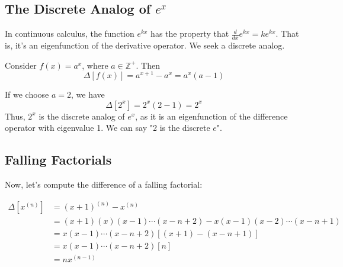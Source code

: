 \documentclass{report}
\begin{document}
\subsection{The Discrete Analog of $e^x$}

In continuous calculus, the function $e^{kx}$ has the property that $\frac{d}{dx}e^{kx} = ke^{kx}$.  That is, it's an eigenfunction of the derivative operator. We seek a discrete analog.

Consider $f(x) = a^x$, where $a \in \mathbb{Z}^+$. Then
\[
	\Delta[f(x)] = a^{x+1} - a^x = a^x(a - 1)
\]

If we choose $a=2$, we have
\[
	\Delta[2^x] = 2^x(2-1) = 2^x
\]
Thus, $2^x$ is the discrete analog of $e^x$, as it is an eigenfunction of the difference operator with eigenvalue 1. We can say "2 is the discrete $e$".

\subsection{Falling Factorials}




Now, let's compute the difference of a falling factorial:

\begin{align*}
	\Delta[x^{(n)}] & = (x+1)^{(n)} - x^{(n)}                                 \\
	                & = (x+1)(x)(x-1)\cdots(x-n+2) - x(x-1)(x-2)\cdots(x-n+1) \\
	                & = x(x-1)\cdots(x-n+2)[(x+1) - (x-n+1)]                  \\
	                & = x(x-1)\cdots(x-n+2)[n]                                \\
	                & = n x^{(n-1)}
\end{align*}
\end{document}
